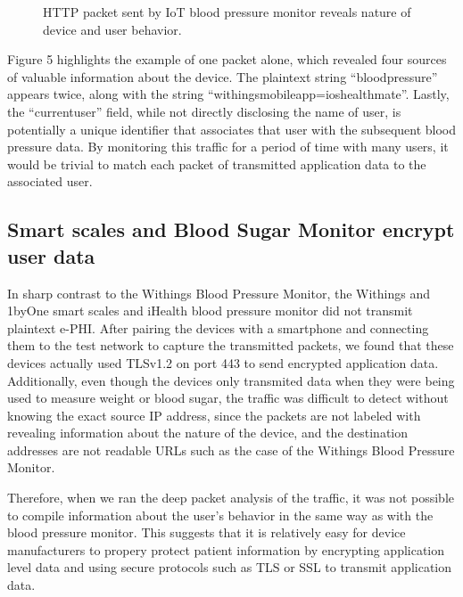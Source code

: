 \begin{figure}
  \centering
  \caption{HTTP packet sent by IoT blood pressure monitor reveals nature of device and user behavior.}
  \label{fig:bp-packet}
\end{figure}

Figure 5 highlights the example of one packet alone, which revealed four sources of valuable information about the device. The plaintext string ``blood\textunderscore pressure'' appears twice, along with the string ``withings\textunderscore mobile\textunderscore app=ios\textunderscore healthmate''. Lastly, the ``current\textunderscore user'' field, while not directly disclosing the name of user, is potentially a unique identifier that associates that user with the subsequent blood pressure data. By monitoring this traffic for a period of time with many users, it would be trivial to match each packet of transmitted application data to the associated user. 

\subsection{Smart scales and Blood Sugar Monitor encrypt user data}
In sharp contrast to the Withings Blood Pressure Monitor, the Withings and 1byOne smart scales and iHealth blood pressure monitor did not transmit plaintext e-PHI. After pairing the devices with a smartphone and connecting them to the test network to capture the transmitted packets, we found that these devices actually used TLSv1.2 on port 443 to send encrypted application data. Additionally, even though the devices only transmited data when they were being used to measure weight or blood sugar, the traffic was difficult to detect without knowing the exact source IP address, since the packets are not labeled with revealing information about the nature of the device, and the destination addresses are not readable URLs such as the case of the Withings Blood Pressure Monitor. 

Therefore, when we ran the deep packet analysis of the traffic, it was not possible to compile information about the user's behavior in the same way as with the blood pressure monitor. This suggests that it is relatively easy for device manufacturers to propery protect patient information by encrypting application level data and using secure protocols such as TLS or SSL to transmit application data.


